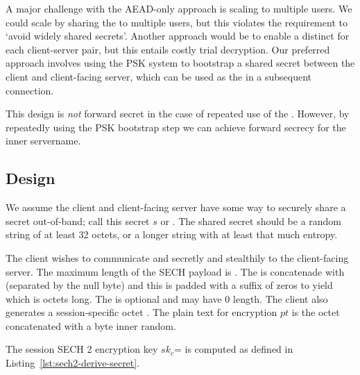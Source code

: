 A major challenge with the \ac{AEAD}-only approach
is scaling to multiple users. We could scale by sharing the \varsechlongtermkey{} to
multiple users, but this violates the requirement to `avoid widely shared secrets'.
Another approach would be to enable a distinct \varsechlongtermkey{} for each client-server pair,
but this entails costly trial decryption.
Our preferred approach involves using the \ac{PSK} system to bootstrap a shared secret between the client and client-facing server,
which can be used as the \varsechlongtermkey{}
in a subsequent connection.

This design is {\em not} forward secret in the case of repeated use of the \varsechlongtermkey{}.
However, by repeatedly using the \ac{PSK} bootstrap step we can achieve forward secrecy for the inner servername.

\subsection{Design}

We assume the client and client-facing server have some way to securely share a secret out-of-band; call this secret $s$ or \varsechlongtermkey{}.
The shared secret should be a random string of at least 32 octets, or a longer string with at least that much entropy.

The client wishes to communicate  and  secretly and stealthily to the client-facing server.
The maximum length of the \ac{SECH} payload is \sechtwoservernamelen{}.
The  is concatenade with  (separated by the null byte)
and this is padded
with a suffix of zeros to yield  which is \sechtwoservernamelen{} octets long.
The  is optional and may have 0 length.
The client also generates a session-specific \sechtwoivlen{} octet \nonce.
The plain text for encryption $pt$ is the \sechtwoservernamelen{} octet  concatenated with a \sechtworandomlen{} byte inner random.

The session \ac{SECH} 2 encryption key $sk_c$= is computed as defined in Listing~\ref{lst:sech2-derive-secret}.

